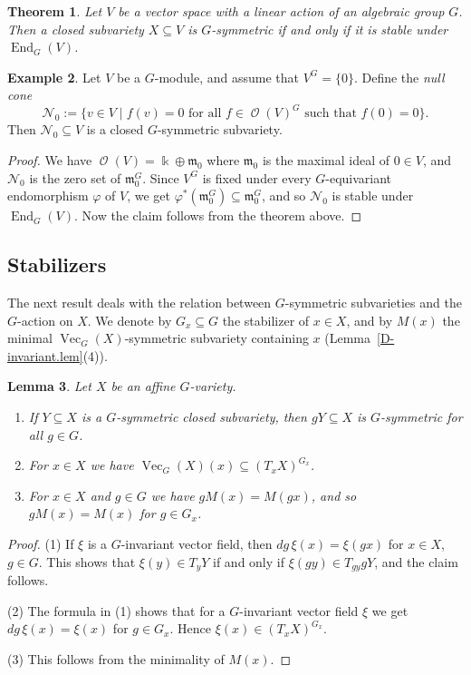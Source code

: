 \documentclass{amsart}
\newtheorem{thm}{Theorem}[section]
\newtheorem{lem}[thm]{Lemma}
\theoremstyle{definition}
\newtheorem{exa}[thm]{Example}
\theoremstyle{remark}
\begin{document}
\begin{thm}\label{main-theorem-2}
Let $V$ be a vector space with a linear action of an algebraic group $G$. Then a closed subvariety $X {\subseteq} V$ is $G$-symmetric if and only if it is stable under $\operatorname{End}_{G}(V)$.
\end{thm}

\begin{exa}
Let $V$ be a $G$-module, and assume that $V^{G}=\{0\}$. Define the {\it null cone}
$$
{\mathcal N}_{0}:= \{v \in V \mid f(v) = 0 \text{ for all }f \in \operatorname{\mathcal O}(V)^{G}\text{ such that }f(0)=0\}.
$$
Then ${\mathcal N}_{0}{\subseteq} V$ is a closed $G$-symmetric subvariety.
\begin{proof}
We have $\operatorname{\mathcal O}(V)={\Bbbk}\oplus {\mathfrak m}_{0}$ where ${\mathfrak m}_{0}$ is the maximal ideal of $0\in V$, and ${\mathcal N}_{0}$ is the zero set of ${\mathfrak m}_{0}^{G}$. Since $V^{G}$ is fixed under every $G$-equivariant endomorphism ${\varphi}$ of $V$, we get ${\varphi}^{*}({\mathfrak m}_{0}^{G}) {\subseteq} {\mathfrak m}_{0}^{G}$, and so ${\mathcal N}_{0}$ is stable under $\operatorname{End}_{G}(V)$. Now the claim follows from the theorem above.
\end{proof}
\end{exa}

{\par\smallskip}
\subsection{Stabilizers}
The next result deals with the relation between $G$-symmetric subvarieties and the $G$-action on $X$. We denote by $G_{x} \subseteq G$ the stabilizer of $x\in X$, and by $M(x)$ the minimal $\operatorname{Vec}_{G}(X)$-symmetric subvariety containing $x$ (Lemma~\ref{D-invariant.lem}(4)).

\begin{lem}
Let $X$ be an affine $G$-variety.
\begin{enumerate}
\item
If $Y {\subseteq} X$ is a $G$-symmetric closed subvariety, then $gY {\subseteq} X$ is $G$-symmetric for all $g \in G$. 
\item
For $x \in X$ we have $\operatorname{Vec}_{G}(X)(x) \subseteq (T_{x}X)^{G_{x}}$.
\item
For $x \in X$ and $g \in G$ we have  $gM(x)=M(gx)$, and so $gM(x)=M(x)$ for $g \in G_{x}$.
\end{enumerate}
\end{lem}
\begin{proof}
(1) If $\xi$ is a $G$-invariant vector field, then $dg \,\xi(x) = \xi(gx)$ for $x \in X$, $g\in G$. This shows that $\xi(y) \in T_{y}Y$ if and only if $\xi(gy) \in T_{gy}gY$, and the claim follows.
\par\smallskip
(2) The formula in (1) shows that for a $G$-invariant vector field $\xi$ we get $dg \,\xi(x) = \xi(x)$ for $g \in G_{x}$. Hence $\xi(x) \in (T_{x}X)^{G_{x}}$.
\par\smallskip
(3) This follows from the  minimality of $M(x)$.
\end{proof}
\end{document}
